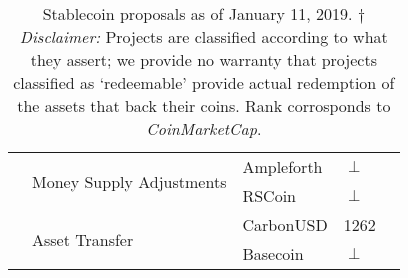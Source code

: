 \begin{table}[t]
\begin{tabular}{|l|l|l|l|l|}
						& \multirow{2}{*}{Money Supply Adjustments}  				& Ampleforth		& $\perp$  \\ \cline{3-4}
						&   													& RSCoin 			& $\perp$  \\ \cline{2-4}
						& \multirow{2}{*}{Asset Transfer}  							& CarbonUSD		& 1262 \\ \cline{3-4}
						&													& Basecoin 		& $\perp$ \\ \cline{1-4}
\hline
\end{tabular}
\caption{Stablecoin proposals as of January 11, 2019. $\dagger$ \textit{Disclaimer:} Projects are classified according to what they assert; \eg we provide no warranty that projects classified as `redeemable' provide actual redemption of the assets that back their coins. Rank corrosponds to \textit{CoinMarketCap}.\label{tab:stablecoins}}
\end{table}



